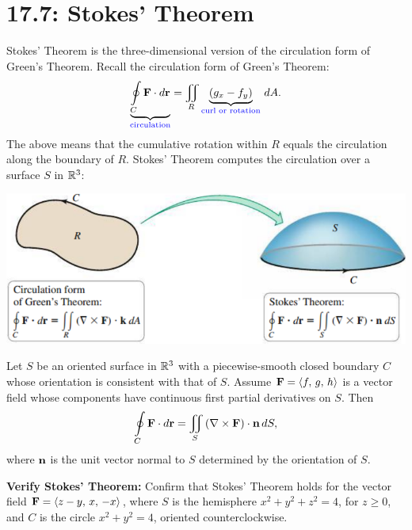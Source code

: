 \documentclass[mathNotesPreamble]{subfiles}
\begin{document}
\section{17.7: Stokes' Theorem}

  Stokes' Theorem is the three-dimensional version of the circulation form of Green's Theorem. Recall the circulation form of Green's Theorem:
    \[\underbrace{\oint\limits_C \mathbf F\cdot d{\mathbf{r}}}_{\textcolor{blue}{\textnormal{circulation}}}=\iint\limits_R \underbrace{(g_x-f_y)}_{\textcolor{blue}{\textnormal{curl or rotation}}}\,dA.\]
  The above means that the cumulative rotation within $R$ equals the circulation along the boundary of $R$. Stokes' Theorem computes the circulation over a surface $S$ in $\mathbb{R}^3$:
  
  \begin{center}
    \includegraphics[width=0.75\linewidth]{images/briggs_17_07/fig17_59}
  \end{center}

  \begin{thmBox*}
    Let $S$ be an oriented surface in $\mathbb{R}^3$ with a piecewise-smooth closed boundary $C$ whose orientation is consistent with that of $S$. Assume $\mathbf F={\left\langle f,\,g,\,h \right\rangle}$ is a vector field whose components have continuous first partial derivatives on $S$. Then
      \[\oint\limits_C \mathbf F\cdot d{\mathbf{r}}=\iint\limits_S {\left(\nabla\times\mathbf F\right)}\cdot{\mathbf{n}}\,dS,\]
    where ${\mathbf{n}}$ is the unit vector normal to $S$ determined by the orientation of $S$.
  \end{thmBox*}
  \pagebreak

  \begin{ex*}
    \textbf{Verify Stokes' Theorem:} Confirm that Stokes' Theorem holds for the vector field $\mathbf F={\left\langle z-y,\,x,\,-x \right\rangle}$, where $S$ is the hemisphere $x^2+y^2+z^2=4$, for $z\geq 0$, and $C$ is the circle $x^2+y^2=4$, oriented counterclockwise.
  \end{ex*}
  \pagebreak
\end{document}
